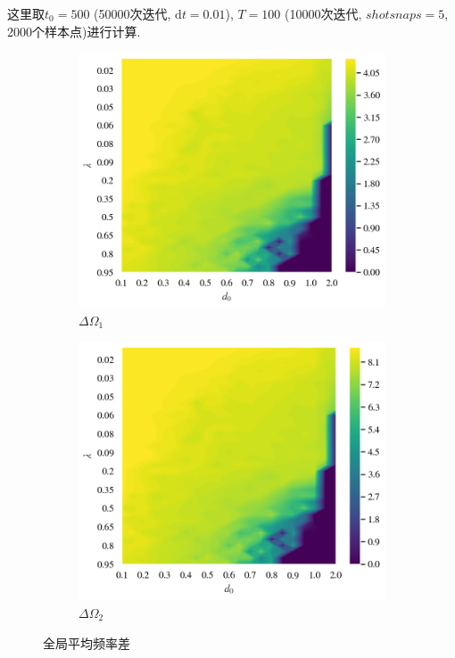 \documentclass{article}
\begin{document}
这里取$t_0=500$ (50000次迭代, $\mathrm{d}t=0.01$), $T=100$ (10000次迭代, $shotsnaps=5$, 2000个样本点)进行计算.

\begin{figure}[H]
	\centering
	\begin{subfigure}[b]{0.49\textwidth}
		\includegraphics[width=\textwidth]{./figs/deltaOmega1.png}
		\vspace{-1cm}
		\caption{$\Delta \Omega _1$}
	\end{subfigure}
	\begin{subfigure}[b]{0.49\textwidth}
		\includegraphics[width=\textwidth]{./figs/deltaOmega2.png}
		\vspace{-1cm}
		\caption{$\Delta \Omega _2$}
	\end{subfigure}
	\vspace{-0.5cm}
	\caption{全局平均频率差}
	\label{fig:fig2.5.global}
\end{figure}
\end{document}
